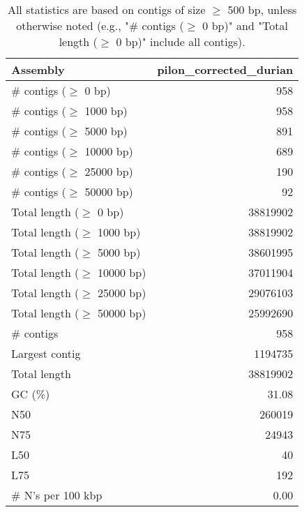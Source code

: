 \documentclass[12pt,a4paper]{article}
\begin{document}
\begin{table}[ht]
\begin{center}
\caption{All statistics are based on contigs of size $\geq$ 500 bp, unless otherwise noted (e.g., "\# contigs ($\geq$ 0 bp)" and "Total length ($\geq$ 0 bp)" include all contigs).}
\begin{tabular}{|l*{1}{|r}|}
\hline
Assembly & pilon\_corrected\_durian \\ \hline
\# contigs ($\geq$ 0 bp) & 958 \\ \hline
\# contigs ($\geq$ 1000 bp) & 958 \\ \hline
\# contigs ($\geq$ 5000 bp) & 891 \\ \hline
\# contigs ($\geq$ 10000 bp) & 689 \\ \hline
\# contigs ($\geq$ 25000 bp) & 190 \\ \hline
\# contigs ($\geq$ 50000 bp) & 92 \\ \hline
Total length ($\geq$ 0 bp) & 38819902 \\ \hline
Total length ($\geq$ 1000 bp) & 38819902 \\ \hline
Total length ($\geq$ 5000 bp) & 38601995 \\ \hline
Total length ($\geq$ 10000 bp) & 37011904 \\ \hline
Total length ($\geq$ 25000 bp) & 29076103 \\ \hline
Total length ($\geq$ 50000 bp) & 25992690 \\ \hline
\# contigs & 958 \\ \hline
Largest contig & 1194735 \\ \hline
Total length & 38819902 \\ \hline
GC (\%) & 31.08 \\ \hline
N50 & 260019 \\ \hline
N75 & 24943 \\ \hline
L50 & 40 \\ \hline
L75 & 192 \\ \hline
\# N's per 100 kbp & 0.00 \\ \hline
\end{tabular}
\end{center}
\end{table}
\end{document}
